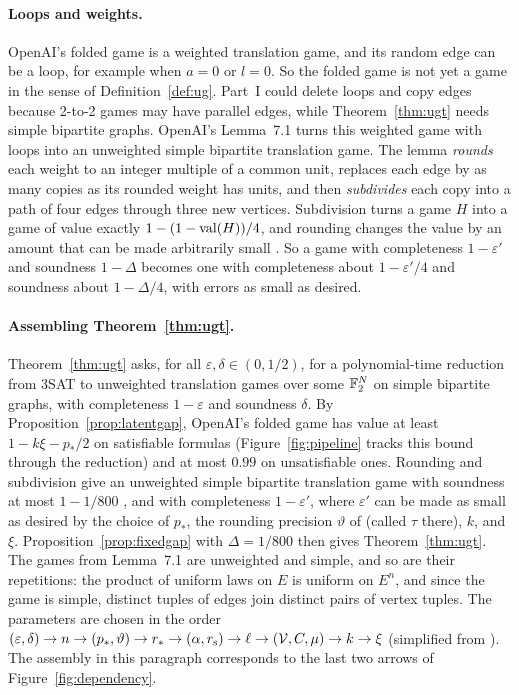 \paragraph{Loops and weights.} OpenAI's folded game is a weighted translation game, and its random edge can be a loop, for example when $a=0$ or $l=0$. So the folded game is not yet a game in the sense of Definition~\ref{def:ug}. Part~I could delete loops and copy edges because 2-to-2 games may have parallel edges, while Theorem~\ref{thm:ugt} needs simple bipartite graphs. OpenAI's Lemma~7.1 turns this weighted game with loops into an unweighted simple bipartite translation game. The lemma \emph{rounds} each weight to an integer multiple of a common unit, replaces each edge by as many copies as its rounded weight has units, and then \emph{subdivides} each copy into a path of four edges through three new vertices. Subdivision turns a game $H$ into a game of value exactly $1-(1-\operatorname{val}(H))/4$, and rounding changes the value by an amount that can be made arbitrarily small \cite[Lemma~7.1 and Equation~(7.2)]{OAI}. So a game with completeness $1-\varepsilon'$ and soundness $1-\Delta$ becomes one with completeness about $1-\varepsilon'/4$ and soundness about $1-\Delta/4$, with errors as small as desired.
\paragraph{Assembling Theorem~\ref{thm:ugt}.} Theorem~\ref{thm:ugt} asks, for all $\varepsilon,\delta\in(0,1/2)$, for a polynomial-time reduction from 3SAT to unweighted translation games over some $\mathbb{F}_2^N$ on simple bipartite graphs, with completeness $1-\varepsilon$ and soundness $\delta$. By Proposition~\ref{prop:latentgap}, OpenAI's folded game has value at least $1-k\xi-p_*/2$ on satisfiable formulas (Figure~\ref{fig:pipeline} tracks this bound through the reduction) and at most $0.99$ on unsatisfiable ones. Rounding and subdivision give an unweighted simple bipartite translation game with soundness at most $1-1/800$ \cite[Lemma~7.1]{OAI}, and with completeness $1-\varepsilon'$, where $\varepsilon'$ can be made as small as desired by the choice of $p_*$, the rounding precision $\vartheta$ of \cite[Lemma~7.1]{OAI} (called $\tau$ there), $k$, and $\xi$. Proposition~\ref{prop:fixedgap} with $\Delta=1/800$ then gives Theorem~\ref{thm:ugt}. The games from Lemma~7.1 are unweighted and simple, and so are their repetitions: the product of uniform laws on $E$ is uniform on $E^n$, and since the game is simple, distinct tuples of edges join distinct pairs of vertex tuples. The parameters are chosen in the order $(\varepsilon,\delta)\to n\to(p_*,\vartheta)\to r_*\to(\alpha,r_{\mathrm s})\to\ell\to(\mathcal{V},C,\mu)\to k\to\xi$ (simplified from \cite[Equation~(5.4)]{OAI}). The assembly in this paragraph corresponds to the last two arrows of Figure~\ref{fig:dependency}.

